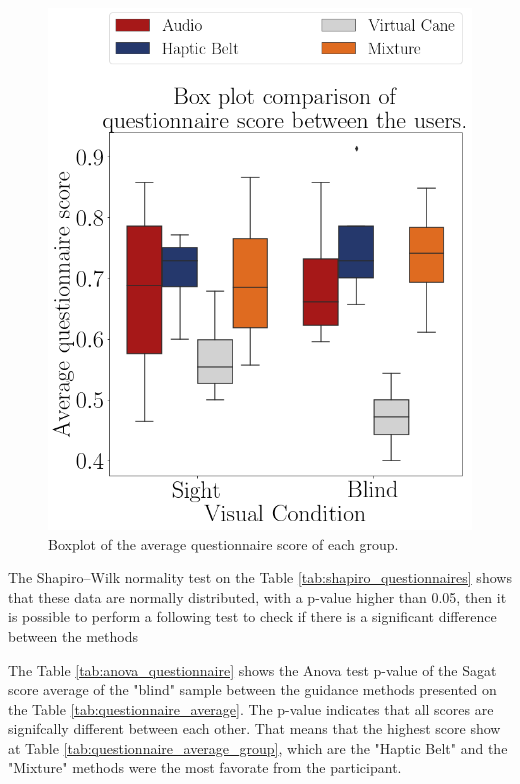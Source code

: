 

\begin{figure}[!htb]
    \centering
    \includegraphics[width = 0.5\linewidth]{Resultados/Questionario/Figuras/png/boxplot_questionnaire_scene.png}
    \caption{Boxplot of the average questionnaire score of each group.}
    \label{fig:boxplot_questionnaire_scene}
\end{figure}

The Shapiro–Wilk normality test on the Table \ref{tab:shapiro_questionnaires} shows that these data are normally distributed, with a p-value higher than 0.05, then it is possible to perform a following test to check if there is a significant difference between the methods



The Table \ref{tab:anova_questionnaire} shows the Anova test p-value of the Sagat score average of the "blind" sample between the guidance methods presented on the Table \ref{tab:questionnaire_average}. The p-value indicates that all scores are signifcally different between each other. That means that the highest score show at Table \ref{tab:questionnaire_average_group}, which are the "Haptic Belt" and the "Mixture" methods were the most favorate from the participant.



\FloatBarrier